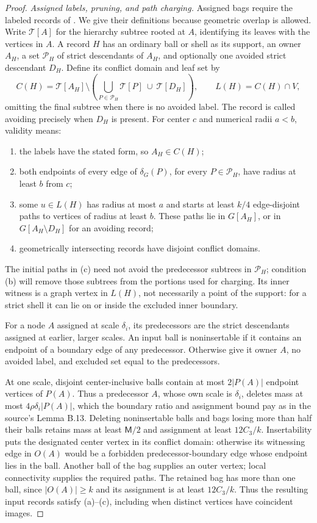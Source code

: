 \begin{proof}
\emph{Assigned labels, pruning, and path charging.}
Assigned bags require the labeled records of
\cite[Section B.4.1]{ThinTreesCompanion}.  We give their definitions
because geometric overlap is allowed.  Write $\mathcal T[A]$ for
the hierarchy subtree rooted at $A$, identifying its leaves with the
vertices in $A$.  A record $H$ has an ordinary ball or shell as its
support, an owner $A_H$, a set $\mathcal P_H$ of strict descendants
of $A_H$, and optionally one avoided strict descendant $D_H$.
Define its conflict domain and leaf set by
\[
 C(H)=\mathcal T[A_H]\setminus
 \left(\bigcup_{P\in\mathcal P_H}\mathcal T[P]
       \ \cup\ \mathcal T[D_H]\right),
 \qquad L(H)=C(H)\cap V,
\]
omitting the final subtree when there is no avoided label.
The record is called avoiding precisely when $D_H$ is present.
For center $c$ and numerical radii $a<b$, validity means:
\begin{enumerate}[label=(\alph*)]
\item the labels have the stated form, so $A_H\in C(H)$;
\item both endpoints of every edge of $\delta_G(P)$,
      for every $P\in\mathcal P_H$, have radius at least $b$ from $c$;
\item some $u\in L(H)$ has radius at most $a$ and starts at least
      $k/4$ edge-disjoint paths to vertices of radius at least $b$.
      These paths lie in $G[A_H]$, or in $G[A_H\setminus D_H]$
      for an avoiding record;
\item geometrically intersecting records have disjoint conflict domains.
\end{enumerate}
The initial paths in (c) need not avoid the predecessor subtrees
in $\mathcal P_H$; condition (b) will remove those subtrees from
the portions used for charging.  Its inner witness is a graph
vertex in $L(H)$, not necessarily a point of the support: for a
strict shell it can lie on or inside the excluded inner boundary.

For a node $A$ assigned at scale $\delta_i$, its predecessors are
the strict descendants assigned at earlier, larger scales.  An input
ball is noninsertable if it contains an endpoint of a boundary edge
of any predecessor.  Otherwise give it owner $A$, no avoided label,
and excluded set equal to the predecessors.

At one scale, disjoint center-inclusive balls contain at most
$2|P(A)|$ endpoint vertices of $P(A)$.  Thus a predecessor $A$,
whose own scale is $\delta_i$, deletes mass at most
$4\rho\delta_i|P(A)|$, which the boundary ratio and
assignment bound pay as in the source's Lemma B.13.  Deleting
noninsertable balls and bags losing more than half their balls
retains mass at least $\mathsf M/2$ and assignment at least
$12C_3/k$.  Insertability puts the designated center vertex in
its conflict domain: otherwise its witnessing edge in $O(A)$
would be a forbidden predecessor-boundary edge whose endpoint
lies in the ball.  Another ball of the bag supplies an outer
vertex; local connectivity supplies the required paths.
The retained bag has more than one ball, since
$|O(A)|\ge k$ and its assignment is at least $12C_3/k$.
Thus the resulting input records satisfy (a)--(c), including when
distinct vertices have coincident images.


\end{proof}
